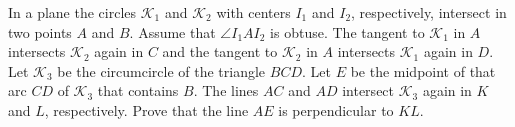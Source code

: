 In a plane the circles $\mathcal K_1$ and $\mathcal K_2$ with centers $I_1$ and $I_2$,  respectively, intersect in two points $A$ and $B$. Assume that $\angle I_1AI_2$ is obtuse. The tangent to $\mathcal K_1$ in $A$ intersects $\mathcal K_2$ again in $C$ and the tangent to $\mathcal K_2$ in $A$ intersects $\mathcal K_1$ again in $D$. Let $\mathcal K_3$ be the circumcircle of the triangle $BCD$. Let $E$ be the midpoint of that arc $CD$ of $\mathcal K_3$ that contains $B$. The lines $AC$ and $AD$ intersect $\mathcal K_3$ again in $K$ and $L$,  respectively. Prove that the line $AE$ is perpendicular to $KL$.